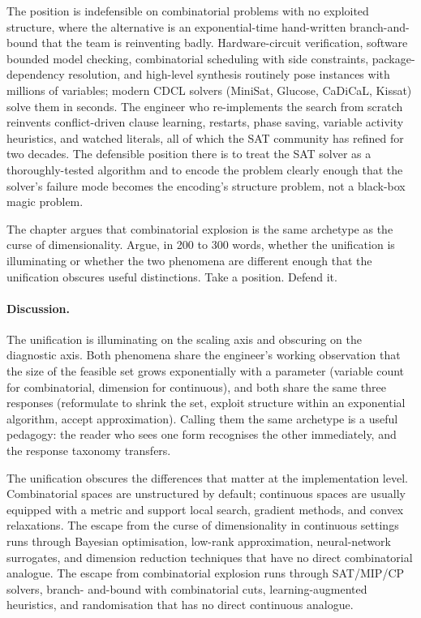 The position is indefensible on combinatorial problems with no
exploited structure, where the alternative is an exponential-time
hand-written branch-and-bound that the team is reinventing badly.
Hardware-circuit verification, software bounded model checking,
combinatorial scheduling with side constraints, package-dependency
resolution, and high-level synthesis routinely pose instances with
millions of variables; modern CDCL solvers (MiniSat, Glucose,
CaDiCaL, Kissat) solve them in seconds. The engineer who
re-implements the search from scratch reinvents conflict-driven
clause learning, restarts, phase saving, variable activity
heuristics, and watched literals, all of which the SAT community
has refined for two decades. The defensible position there is to
treat the SAT solver as a thoroughly-tested algorithm and to
encode the problem clearly enough that the solver's failure mode
becomes the encoding's structure problem, not a black-box magic
problem.

\begin{exercise}
The chapter argues that combinatorial explosion is the same
archetype as the curse of dimensionality. Argue, in 200 to 300
words, whether the unification is illuminating or whether the two
phenomena are different enough that the unification obscures
useful distinctions. Take a position. Defend it.
\end{exercise}

\paragraph{Discussion.}
The unification is illuminating on the scaling axis and obscuring
on the diagnostic axis. Both phenomena share the engineer's
working observation that the size of the feasible set grows
exponentially with a parameter (variable count for combinatorial,
dimension for continuous), and both share the same three
responses (reformulate to shrink the set, exploit structure within
an exponential algorithm, accept approximation). Calling them the
same archetype is a useful pedagogy: the reader who sees one form
recognises the other immediately, and the response taxonomy
transfers.

The unification obscures the differences that matter at the
implementation level. Combinatorial spaces are unstructured by
default; continuous spaces are usually equipped with a metric and
support local search, gradient methods, and convex relaxations.
The escape from the curse of dimensionality in continuous settings
runs through Bayesian optimisation, low-rank approximation,
neural-network surrogates, and dimension reduction techniques that
have no direct combinatorial analogue. The escape from
combinatorial explosion runs through SAT/MIP/CP solvers, branch-
and-bound with combinatorial cuts, learning-augmented heuristics,
and randomisation that has no direct continuous analogue.

